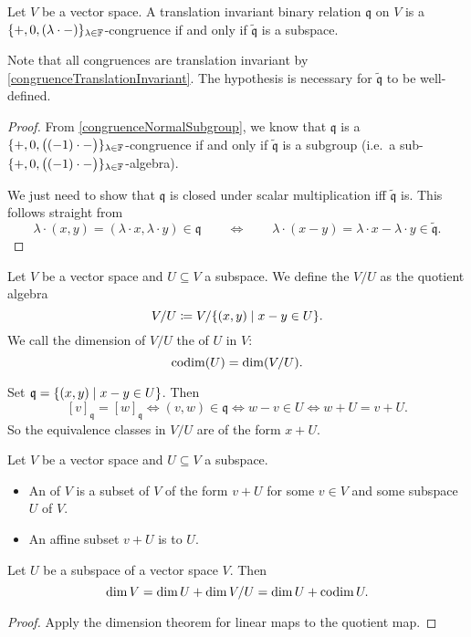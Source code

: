 \begin{proposition} \label{congruenceSubspace}
Let $V$ be a vector space.
A translation invariant binary relation $\mathfrak{q}$ on $V$ is a $\{+,0, (\lambda\cdot -)\}_{\lambda\in\mathbb{F}}$-congruence \textup{if and only if} $\widetilde{\mathfrak{q}}$ is a subspace.
\end{proposition}
Note that all congruences are translation invariant by \ref{congruenceTranslationInvariant}. The hypothesis is necessary for $\widetilde{\mathfrak{q}}$ to be well-defined.
\begin{proof}
From \ref{congruenceNormalSubgroup}, we know that $\mathfrak{q}$ is a $\{+,0, \big((-1)\cdot -\big)\}_{\lambda\in\mathbb{F}}$-congruence if and only if $\widetilde{\mathfrak{q}}$ is a subgroup (i.e.\ a sub-$\{+,0, \big((-1)\cdot -\big)\}_{\lambda\in\mathbb{F}}$-algebra).

We just need to show that $\mathfrak{q}$ is closed under scalar multiplication iff $\widetilde{\mathfrak{q}}$ is. This follows straight from
\[ \lambda\cdot(x,y) = (\lambda\cdot x, \lambda\cdot y)\in \mathfrak{q} \qquad\iff\qquad \lambda\cdot(x-y) = \lambda\cdot x - \lambda\cdot y\in \widetilde{\mathfrak{q}}. \]
\end{proof}


\begin{definition}
Let $V$ be a vector space and $U\subseteq V$ a subspace.
We define the  $V/U$ as the quotient algebra
\[ V/U \defeq V/\setbuilder{(x,y)}{x-y\in U}. \]
We call the dimension of $V/U$ the  of $U$ in $V$:
\[ \operatorname{codim}(U) = \dim(V/U). \]
\end{definition}


Set $\mathfrak{q} = \setbuilder{(x,y)}{x-y\in U}$. Then
\[ [v]_\mathfrak{q}=[w]_\mathfrak{q} \iff (v,w)\in\mathfrak{q} \iff w-v\in U \iff w+U = v+U. \]
So the equivalence classes in $V/U$ are of the form $x+U$.

\begin{definition}
Let $V$ be a vector space and $U\subseteq V$ a subspace.
\begin{itemize}
\item An  of $V$ is a subset of $V$ of the form $v+U$ for some $v\in V$ and some subspace $U$ of $V$.
\item An affine subset $v+U$ is  to $U$.
\end{itemize}
\end{definition}

\begin{proposition} \label{dimensionTheoremQuotientSpace}
Let $U$ be a subspace of a vector space $V$. Then
\[ \dim V = \dim U + \dim V/U = \dim U + \operatorname{codim} U.  \]
\end{proposition}
\begin{proof}
Apply the dimension theorem for linear maps to the quotient map.
\end{proof}

